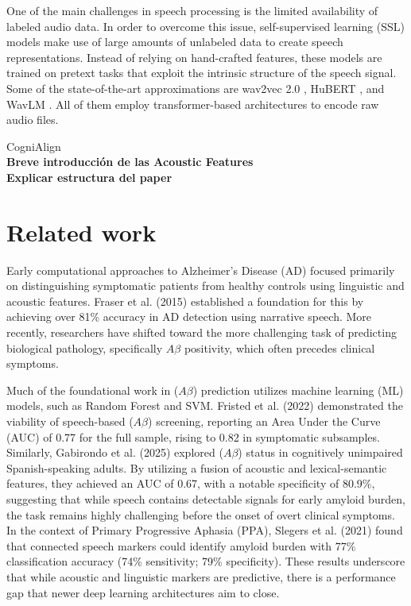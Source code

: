 \documentclass{Odyssey2026}
\begin{document}
One of the main challenges in speech processing is the limited availability of labeled audio data. In order to overcome this issue, self-supervised learning (SSL) models make use of large amounts of unlabeled data to create speech representations. Instead of relying on hand-crafted features, these models are trained on pretext tasks that exploit the intrinsic structure of the speech signal. Some of the state-of-the-art approximations are wav2vec 2.0 \cite{NEURIPS2020_92d1e1eb}, HuBERT \cite{10.1109/TASLP.2021.3122291}, and WavLM \cite{chen2022wavlm}. All of them employ transformer-based architectures to encode raw audio files.

CogniAlign \cite{ORTIZPEREZ2025114264}\\
\textbf{Breve introducción de las Acoustic Features}\\

\textbf{Explicar estructura del paper}
\section{Related work}
Early computational approaches to Alzheimer’s Disease (AD) focused primarily on distinguishing symptomatic patients from healthy controls using linguistic and acoustic features. Fraser et al. (2015) established a foundation for this by achieving over 81\% accuracy in AD detection using narrative speech. More recently, researchers have shifted toward the more challenging task of predicting biological pathology, specifically $A\beta$ 
positivity, which often precedes clinical symptoms.

Much of the foundational work in ($A\beta$) prediction utilizes machine learning (ML) models, such as Random Forest and SVM. Fristed et al. (2022) demonstrated the viability of speech-based ($A\beta$) screening, reporting an Area Under the Curve (AUC) of 0.77 for the full sample, rising to 0.82 in symptomatic subsamples. Similarly, Gabirondo et al. (2025) explored ($A\beta$) status in cognitively unimpaired Spanish-speaking adults. By utilizing a fusion of acoustic and lexical-semantic features, they achieved an AUC of 0.67, with a notable specificity of 80.9\%, suggesting that while speech contains detectable signals for early amyloid burden, the task remains highly challenging before the onset of overt clinical symptoms. In the context of Primary Progressive Aphasia (PPA), Slegers et al. (2021) found that connected speech markers could identify amyloid burden with 77\% classification accuracy (74\% sensitivity; 79\% specificity). These results underscore that while acoustic and linguistic markers are predictive, there is a performance gap that newer deep learning architectures aim to close.
\end{document}
